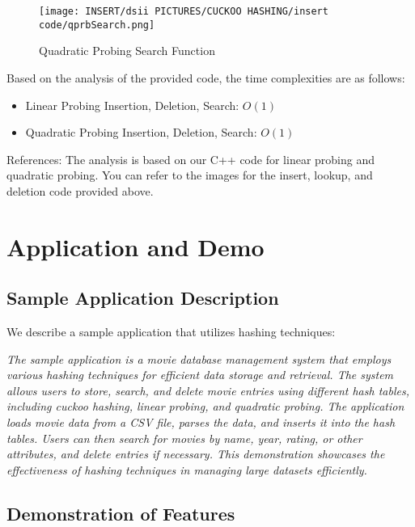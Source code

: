 \documentclass[12pt]{article}
\begin{document}
\begin{figure}[htbp]
    \centering
    \texttt{[image: INSERT/dsii PICTURES/CUCKOO HASHING/insert code/qprbSearch.png]}
    \caption{Quadratic Probing Search Function}
    \label{fig:quadratic_search}
\end{figure}

\newpage

Based on the analysis of the provided code, the time complexities are as follows:
\begin{itemize}
    \item Linear Probing Insertion, Deletion, Search: $O(1)$
    \item Quadratic Probing Insertion, Deletion, Search: $O(1)$
\end{itemize}

References: The analysis is based on our C++ code for linear probing and quadratic probing. You can refer to the images for the insert, lookup, and deletion code provided above.



\section{Application and Demo}

\subsection{Sample Application Description}

We describe a sample application that utilizes hashing techniques:

\textit{The sample application is a movie database management system that employs various hashing techniques for efficient data storage and retrieval. The system allows users to store, search, and delete movie entries using different hash tables, including cuckoo hashing, linear probing, and quadratic probing. The application loads movie data from a CSV file, parses the data, and inserts it into the hash tables. Users can then search for movies by name, year, rating, or other attributes, and delete entries if necessary. This demonstration showcases the effectiveness of hashing techniques in managing large datasets efficiently.}

\subsection{Demonstration of Features}
\end{document}
